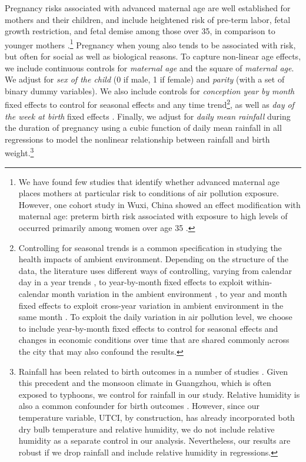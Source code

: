 Pregnancy risks associated with advanced maternal age are well
established for mothers and their children, and include heightened risk of
pre-term labor, fetal growth restriction, and fetal demise among those
over 35, in comparison to younger mothers \autocite{sauer_reproduction_2015}.\footnote{We have
  found few studies that identify whether advanced maternal age places
  mothers at particular risk to conditions of air pollution exposure.
  However, one cohort study in Wuxi, China showed an effect modification
  with maternal age: preterm birth risk associated with exposure to high
  levels of \PARPMTEN occurred primarily among women over age 35 \autocite{han_maternal_2018}.} Pregnancy when young also tends to be associated with risk, but
often for social as well as biological reasons. To capture non-linear
age effects, we include continuous controls for \emph{maternal age} and the square of
\emph{maternal age}. We adjust for \emph{sex of the child} (0 if
male, 1 if female) and \emph{parity} (with a set of binary dummy
variables). We also include controls for \emph{conception year by} \emph{month}
fixed effects to control for seasonal effects and any time trend\footnote{Controlling for seasonal trends is a common specification in studying the health impacts of ambient environment. Depending on the structure of the data, the literature uses different ways of controlling, varying from calendar day in a year trends \autocite{chen_effects_2020}, to year-by-month fixed effects to exploit within-calendar month variation in the ambient environment \autocite{janke_air_2014}, to year and month fixed effects to exploit cross-year variation in ambient environment in the same month \autocite{currie_weathering_2013}. To exploit the daily variation in air pollution level, we choose to include year-by-month fixed effects to control for seasonal effects and changes in economic conditions over time that are shared commonly across the city that may also confound the results.}, as
well as \emph{day of the week at birth} fixed effects \autocite{he_ambient_2016}. Finally, we
adjust for \emph{daily mean rainfall} during the duration of pregnancy
using a cubic function of daily mean rainfall in all regressions to
model the nonlinear relationship between rainfall and birth weight.\footnote{Rainfall has been related to birth outcomes in a number of studies \autocite{currie_weathering_2013, rocha_water_2015}. Given this precedent and the monsoon climate in Guangzhou, which is often exposed to typhoons, we control for rainfall in our study. Relative humidity is also a common confounder for birth outcomes \autocite{he_ambient_2016, rich_differences_2015}. However, since our temperature variable, UTCI, by construction, has already incorporated both dry bulb temperature and relative humidity, we do not include relative humidity as a separate control in our analysis. Nevertheless, our results are robust if we drop rainfall and include relative humidity in regressions.}

